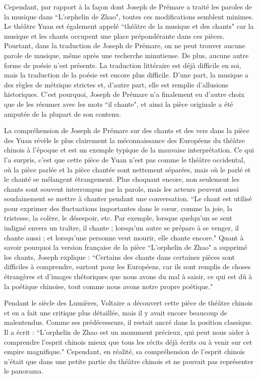 \documentclass[UTF8,a4paper,12pt]{ctexart}
\numberwithin{equation}{section}
\begin{document}
Cependant, par rapport à la façon dont Joseph de Prémare a traité les paroles de la musique dans ``L'orphelin de Zhao", toutes ces modifications semblent minimes. Le théâtre Yuan est également appelé ``théâtre de la musique et des chants" car la musique et les chants occupent une place prépondérante dans ces pièces. Pourtant, dans la traduction de Joseph de Prémare, on ne peut trouver aucune parole de musique, même après une recherche minutieuse. De plus, aucune autre forme de poésie n'est présente. La traduction littéraire est déjà difficile en soi, mais la traduction de la poésie est encore plus difficile. D'une part, la musique a des règles de métrique strictes et, d'autre part, elle est remplie d'allusions historiques. C'est pourquoi, Joseph de Prémare n'a finalement eu d'autre choix que de les résumer avec les mots ``il chante", et ainsi la pièce originale a été amputée de la plupart de son contenu.

La compréhension de Joseph de Prémare sur des chants et des vers dans la pièce des Yuan révèle le plus clairement la méconnaissance des Européens du théâtre chinois à l'époque et est un exemple typique de la mauvaise interprétation. Ce qui l'a surpris, c'est que cette pièce de Yuan n'est pas comme le théâtre occidental, où la pièce parlée et la pièce chantée sont nettement séparées, mais où le parlé et le chanté se mélangent étrangement. Plus choquant encore, non seulement les chants sont souvent interrompus par la parole, mais les acteurs peuvent aussi soudainement se mettre à chanter pendant une conversation. ``Le chant est utilisé pour exprimer des fluctuations importantes dans le cœur, comme la joie, la tristesse, la colère, le désespoir, etc. Par exemple, lorsque quelqu'un se sent indigné envers un traître, il chante ; lorsqu'un autre se prépare à se venger, il chante aussi ; et lorsqu'une personne veut mourir, elle chante encore." Quant à savoir pourquoi la version française de la pièce ``L'orphelin de Zhao" a supprimé les chants, Joseph explique : ``Certains des chants dans certaines pièces sont difficiles à comprendre, surtout pour les Européens, car ils sont remplis de choses étrangères et d'images rhétoriques que nous avons du mal à saisir, ce qui est dû à la poétique chinoise, tout comme nous avons notre propre poétique."

Pendant le siècle des Lumières, Voltaire a découvert cette pièce de théâtre chinois et en a fait une critique plus détaillée, mais il y avait encore beaucoup de malentendus. Comme ses prédécesseurs, il restait ancré dans la position classique. Il a écrit : ``L'orphelin de Zhao est un monument précieux, qui peut nous aider à comprendre l'esprit chinois mieux que tous les récits déjà écrits ou à venir sur cet empire magnifique." Cependant, en réalité, sa compréhension de l'esprit chinois n'était que dans une petite partie du théâtre chinois et ne pouvait pas représenter le panorama.
\end{document}
